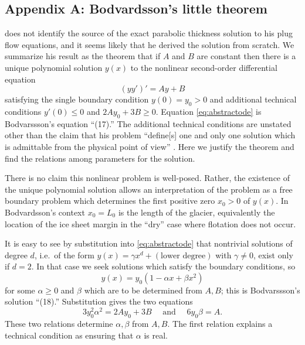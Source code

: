 \documentclass[twocolumn,letterpaper]{igs}
\begin{document}
\appendix

\subsection{Appendix A: Bodvardsson's little theorem}  \cite{Bodvardsson} does not identify the source of the exact parabolic thickness solution to his plug flow equations, and it seems likely that he derived the solution from scratch.  We summarize his result as the theorem that if $A$ and $B$ are constant then there is a unique polynomial solution $y(x)$ to the nonlinear second-order differential equation
\begin{equation}
  (y y')' = Ay+B  \label{eq:abstractode}
\end{equation}
satisfying the single boundary condition $y(0) = y_0 > 0$ and additional technical conditions $y'(0) \le 0$ and $2A y_0 + 3 B \ge 0$.  Equation \eqref{eq:abstractode} is Bodvarssson's equation ``(17).''  The additional technical conditions are unstated other than the claim that his problem ``define[s] one and only one solution which is admittable from the physical point of view'' \citep{Bodvardsson}.  Here we justify the theorem and find the relations among parameters for the solution.

There is no claim this nonlinear problem is well-posed.  Rather, the existence of the unique polynomial solution allows an interpretation of the problem as a free boundary problem which determines the first positive zero $x_0>0$ of $y(x)$.  In Bodvardsson's context $x_0=L_0$ is the length of the glacier, equivalently the location of the ice sheet margin in the ``dry'' case where flotation does not occur.

It is easy to see by substitution into \eqref{eq:abstractode} that nontrivial solutions of degree $d$, i.e.~of the form $y(x) = \gamma x^d + (\text{lower degree})$ with $\gamma\ne 0$, exist only if $d=2$.  In that case we seek solutions which satisfy the boundary conditions, so
\begin{equation}
y(x) = y_0(1 - \alpha x + \beta x^2)  \label{eq:abstractsoln}
\end{equation}
for some $\alpha\ge 0$ and $\beta$ which are to be determined from $A,B$; this is Bodvarssson's solution ``(18).''  Substitution gives the two equations
\begin{equation}
3 y_0^2 \alpha^2 = 2 A y_0 + 3 B \quad \text{ and } \quad 6 y_0 \beta = A.  \label{eq:abstractrelations}
\end{equation}
These two relations determine $\alpha,\beta$ from $A,B$.  The first relation explains a technical condition as ensuring that $\alpha$ is real.
\end{document}

